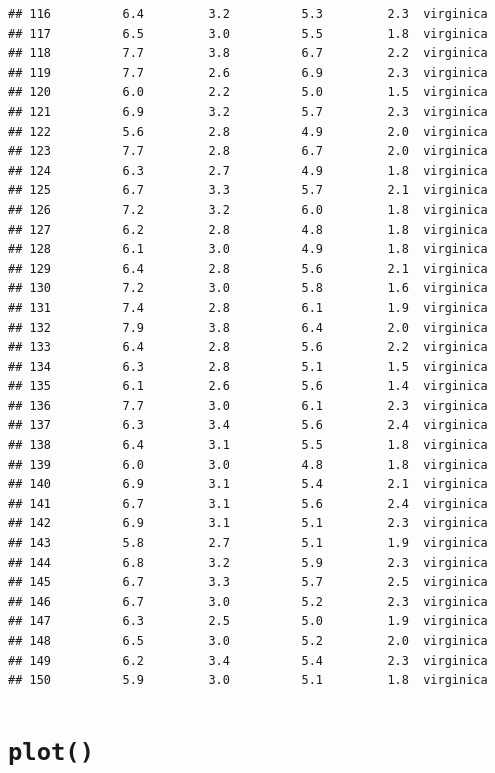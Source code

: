 \documentclass[
]{book}
\begin{document}
\begin{verbatim}
## 116          6.4         3.2          5.3         2.3  virginica
## 117          6.5         3.0          5.5         1.8  virginica
## 118          7.7         3.8          6.7         2.2  virginica
## 119          7.7         2.6          6.9         2.3  virginica
## 120          6.0         2.2          5.0         1.5  virginica
## 121          6.9         3.2          5.7         2.3  virginica
## 122          5.6         2.8          4.9         2.0  virginica
## 123          7.7         2.8          6.7         2.0  virginica
## 124          6.3         2.7          4.9         1.8  virginica
## 125          6.7         3.3          5.7         2.1  virginica
## 126          7.2         3.2          6.0         1.8  virginica
## 127          6.2         2.8          4.8         1.8  virginica
## 128          6.1         3.0          4.9         1.8  virginica
## 129          6.4         2.8          5.6         2.1  virginica
## 130          7.2         3.0          5.8         1.6  virginica
## 131          7.4         2.8          6.1         1.9  virginica
## 132          7.9         3.8          6.4         2.0  virginica
## 133          6.4         2.8          5.6         2.2  virginica
## 134          6.3         2.8          5.1         1.5  virginica
## 135          6.1         2.6          5.6         1.4  virginica
## 136          7.7         3.0          6.1         2.3  virginica
## 137          6.3         3.4          5.6         2.4  virginica
## 138          6.4         3.1          5.5         1.8  virginica
## 139          6.0         3.0          4.8         1.8  virginica
## 140          6.9         3.1          5.4         2.1  virginica
## 141          6.7         3.1          5.6         2.4  virginica
## 142          6.9         3.1          5.1         2.3  virginica
## 143          5.8         2.7          5.1         1.9  virginica
## 144          6.8         3.2          5.9         2.3  virginica
## 145          6.7         3.3          5.7         2.5  virginica
## 146          6.7         3.0          5.2         2.3  virginica
## 147          6.3         2.5          5.0         1.9  virginica
## 148          6.5         3.0          5.2         2.0  virginica
## 149          6.2         3.4          5.4         2.3  virginica
## 150          5.9         3.0          5.1         1.8  virginica
\end{verbatim}

\hypertarget{plot}{%
\section{\texorpdfstring{\texttt{plot()}}{plot()}}\label{plot}}
\end{document}
